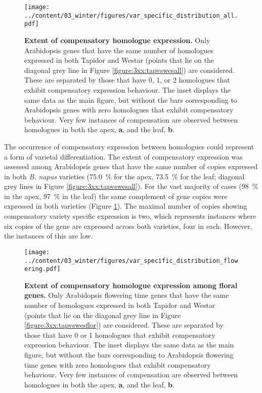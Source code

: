 \documentclass[12pt,]{book}
\begin{document}
\begin{figure}[htbp]
\centering
\texttt{[image: ../content/03\_winter/figures/var\_specific\_distribution\_all.pdf]}
\caption{\textbf{Extent of compensatory homologue expression.} Only
Arabidopsis genes that have the same number of homologues expressed in
both Tapidor and Westar (points that lie on the diagonal grey line in
Figure \ref{figure:3xx:tapvswesall}) are considered. These are separated
by those that have 0, 1, or 2 homologues that exhibit compensatory
expression behaviour. The inset displays the same data as the main
figure, but without the bars corresponding to Arabidopsis genes with
zero homologues that exhibit compensatory behaviour. Very few instances
of compensation are observed between homologues in both the apex,
\textbf{a}, and the leaf, \textbf{b}.}\label{figure:3xx:varspecificall}
\end{figure}

The occurrence of compensatory expression between homologues could
represent a form of varietal differentiation. The extent of compensatory
expression was assessed among Arabidopsis genes that have the same
number of copies expressed in both \emph{B. napus} varieties (75.0~\%
for the apex, 73.5~\% for the leaf; diagonal grey lines in Figure
\ref{figure:3xx:tapvswesall}). For the vast majority of cases (98~\% in
the apex, 97~\% in the leaf) the same complement of gene copies were
expressed in both varieties (Figure \ref{figure:3xx:varspecificall}).
The maximal number of copies showing compensatory variety specific
expression is two, which represents instances where six copies of the
gene are expressed across both varieties, four in each. However, the
instances of this are low.

\begin{figure}[htbp]
\centering
\texttt{[image: ../content/03\_winter/figures/var\_specific\_distribution\_flowering.pdf]}
\caption{\textbf{Extent of compensatory homologue expression among
floral genes.} Only Arabidopsis flowering time genes that have the same
number of homologues expressed in both Tapidor and Westar (points that
lie on the diagonal grey line in Figure \ref{figure:3xx:tapvswesflor})
are considered. These are separated by those that have 0 or 1 homologues
that exhibit compensatory expression behaviour. The inset displays the
same data as the main figure, but without the bars corresponding to
Arabidopsis flowering time genes with zero homologues that exhibit
compensatory behaviour. Very few instances of compensation are observed
between homologues in both the apex, \textbf{a}, and the leaf,
\textbf{b}.}\label{figure:3xx:varspecificflor}
\end{figure}
\end{document}
